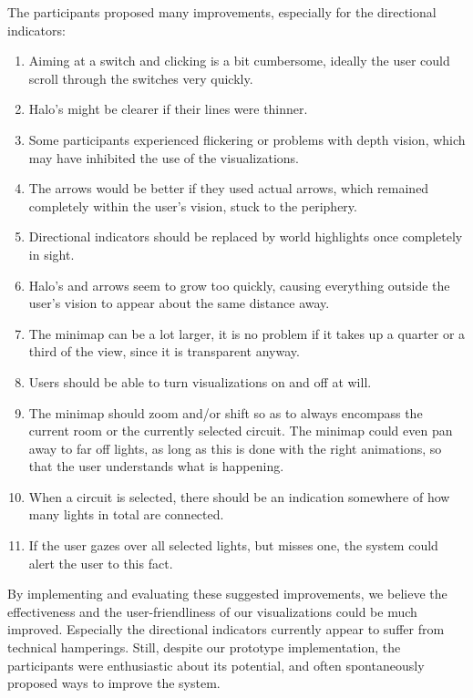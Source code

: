 The participants proposed many improvements, especially for the directional indicators:
\begin{enumerate}
  \item Aiming at a switch and clicking is a bit cumbersome, ideally the user could scroll through the switches very quickly.
  \item Halo's might be clearer if their lines were thinner.
  \item Some participants experienced flickering or problems with depth vision, which may have inhibited the use of the visualizations.
  \item The arrows would be better if they used actual arrows, which remained completely within the user's vision, stuck to the periphery.
  \item Directional indicators should be replaced by world highlights once completely in sight.
  \item Halo's and arrows seem to grow too quickly, causing everything outside the user's vision to appear about the same distance away.
  \item The minimap can be a lot larger, it is no problem if it takes up a quarter or a third of the view, since it is transparent anyway.
  \item Users should be able to turn visualizations on and off at will.
  \item The minimap should zoom and/or shift so as to always encompass the current room or the currently selected circuit. The minimap could even pan away to far off lights, as long as this is done with the right animations, so that the user understands what is happening.
  \item When a circuit is selected, there should be an indication somewhere of how many lights in total are connected.
  \item If the user gazes over all selected lights, but misses one, the system could alert the user to this fact.
\end{enumerate}

By implementing and evaluating these suggested improvements, we believe the effectiveness and the user-friendliness of our visualizations could be much improved. Especially the directional indicators currently appear to suffer from technical hamperings. Still, despite our prototype implementation, the participants were enthusiastic about its potential, and often spontaneously proposed ways to improve the system.
